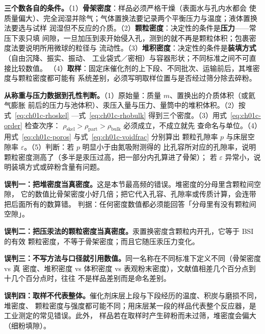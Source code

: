 \begin{measure}
\textbf{三个数各自的条件。}（1）\textbf{骨架密度}：样品必须严格干燥（表面水与孔内水都会
使质量偏大）、完全润湿并除气；气体置换法要记录两个平衡压力与温度；液体置换法要选与试样
润湿但不反应的介质。（2）\textbf{颗粒密度}：决定性的条件是\textbf{压力}——常压下汞只填
间隙，一旦加压到汞开始侵入孔，测到的就不再是颗粒体积；包裹密度法要说明所用微球的粒径与
流动性。（3）\textbf{堆积密度}：决定性的条件是\textbf{装填方式}（自由沉降、振实、振动、
工业袋式／密相）与容器形状；不同标准之间不可直接比较数值。
（4）\textbf{取样}：固定床催化剂的上下段、不同批次、运输前后，其堆密度与颗粒密度都可能有
系统差别，必须写明取样位置与是否经过筛分除去碎粉。
\end{measure}

\begin{dataflow}
\textbf{从称重与压力数据到孔性判断。}（1）原始量：质量 $m$、置换出的介质体积（或氦气膨胀
前后的压力与池体积）、汞压入量与压力、量筒中的堆积体积。（2）按式~\eqref{eq:ch01c-rhoskel}
—式~\eqref{eq:ch01c-rhobulk} 得到三个密度。（3）用式~\eqref{eq:ch01c-order} 检查次序：
$\rho_{\mathrm{skel}}>\rho_{\mathrm{part}}>\rho_{\mathrm{bulk}}$ 必须成立，不成立就先
查命名与单位。（4）用式~\eqref{eq:ch01c-poros} 与式~\eqref{eq:ch01c-voidfrac} 分别算出
颗粒孔隙率 $p$ 与床层空隙率 $\varepsilon$。（5）判断：若 $p$ 明显小于由氮吸附测得的
比孔容所对应的孔隙率，说明颗粒密度测高了（多半是汞压过高，把一部分内孔算进了骨架）；
若 $\varepsilon$ 异常小，说明装填方式或碎粉含量有问题。
\end{dataflow}

\begin{pitfall}
\textbf{误判一：把堆密度当真密度。}这是本节最高频的错误。堆密度的分母里含颗粒间空隙，
它的数值比骨架密度小好几倍；把它代入孔容、孔隙率或传质计算，会连带把后面所有的数算错。
判据：任何密度数值都必须能回答「分母里有没有颗粒间空隙」。

\textbf{误判二：把压汞法的颗粒密度当真密度。}汞置换密度含颗粒内开孔，它等于 BSI 的有效
颗粒密度，不等于骨架密度；而且它随压汞压力变化。

\textbf{误判三：不写方法与口径就引用数值。}同一名称在不同标准下定义不同（骨架密度 vs 真
密度、堆积密度 vs 体积密度 vs 表观粉末密度），文献值相差几个百分点到十几个百分点时，往往
不是样品差别而是命名差别。

\textbf{误判四：取样不代表整体。}催化剂床层上段与下段经历的温度、积炭与磨损不同，堆密度、
颗粒密度与强度都可能不同；用床层某一段的样品代表整个反应器，是工业测定的常见错误。此外，
样品若在取样时产生碎粉而未过筛，堆密度会偏大（细粉填隙）。
\end{pitfall}

